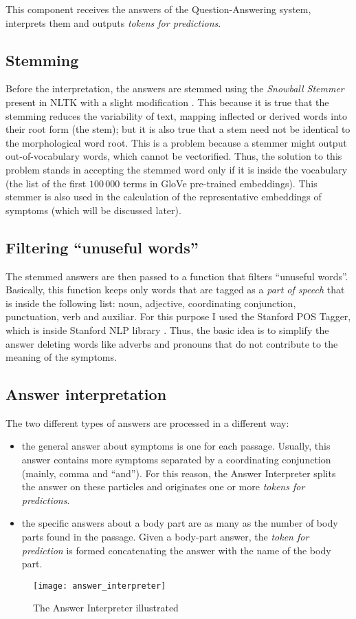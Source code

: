 This component receives the answers of the Question-Answering system, interprets them and outputs \textit{tokens for predictions}.
\subsection{Stemming}
\label{sec:stemming}
Before the interpretation, the answers are stemmed using the \textit{Snowball Stemmer} present in NLTK with a slight modification \cite{snowballstemmer, nltk}. This because it is true that the stemming reduces the variability of text, mapping inflected or derived words into their root form (the stem); but it is also true that a stem need not be identical to the morphological word root. This is a problem because a stemmer might output out-of-vocabulary words, which cannot be vectorified. Thus, the solution to this problem stands in accepting the stemmed word only if it is inside the vocabulary (the list of the first $100\,000$ terms in GloVe pre-trained embeddings). This stemmer is also used in the calculation of the representative embeddings of symptoms (which will be discussed later).

\subsection{Filtering ``unuseful words''}
The stemmed answers are then passed to a function that filters ``unuseful words''. Basically, this function keeps only words that are tagged as a \textit{part of speech} that is inside the following list: noun, adjective, coordinating conjunction, punctuation, verb and auxiliar. For this purpose I used the Stanford POS Tagger, which is inside Stanford NLP library \cite{stanfordnlp}. Thus, the basic idea is to simplify the answer deleting words like adverbs and pronouns that do not contribute to the meaning of the symptoms.

\subsection{Answer interpretation}
The two different types of answers are processed in a different way:
\begin{itemize}
  \item the general answer about symptoms is one for each passage. Usually, this answer contains more symptoms separated by a coordinating conjunction (mainly, comma and ``and''). For this reason, the Answer Interpreter splits the answer on these particles and originates one or more \textit{tokens for predictions}.
  \item the specific answers about a body part are as many as the number of body parts found in the passage. Given a body-part answer, the \textit{token for prediction} is formed concatenating the answer with the name of the body part.
\end{itemize}

\begin{figure}[h]
\centering
\texttt{[image: answer\_interpreter]}
\caption{The Answer Interpreter illustrated}
\medskip
\label{fig:answer_int}
\end{figure}
